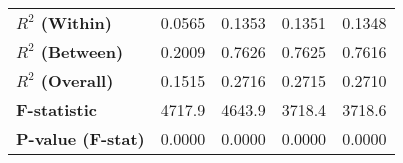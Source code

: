 {\begin{longtable}{>{\bfseries}lcccc}
$R^{2}$ (Within)                &       0.0565       &             0.1353            &             0.1351             &         0.1348         \\
$R^{2}$ (Between)               &       0.2009       &             0.7626            &             0.7625             &         0.7616         \\
$R^{2}$ (Overall)               &       0.1515       &             0.2716            &             0.2715             &         0.2710         \\
F-statistic                       &       4717.9       &             4643.9            &             3718.4             &         3718.6         \\
P-value (F-stat)                  &       0.0000       &             0.0000            &             0.0000             &         0.0000         \\
\bottomrule
\end{longtable}
}
